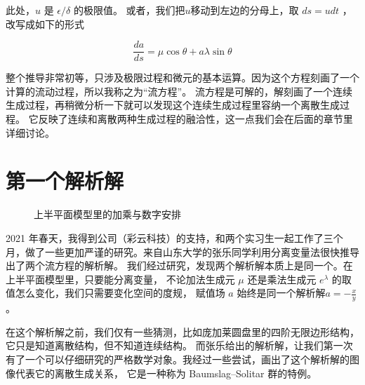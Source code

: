 \documentclass[a4paper,12pt]{book}
\numberwithin{problem}{section}
\numberwithin{definition}{section}
\numberwithin{lemma}{section}
\numberwithin{proposition}{section}
\numberwithin{theorem}{section}
\numberwithin{grammar}{section}
\numberwithin{program}{section}
\numberwithin{convention}{section}
\numberwithin{corollary}{section}
\begin{document}
此处，$u$ 是 $\epsilon / \delta$ 的极限值。 或者，我们把$u$移动到左边的分母上，取 $ds = u dt$ ，改写成如下的形式

\begin{equation}
\frac{da}{ds} = \mu \cos \theta + a \lambda \sin \theta\label{eq:flow}
\end{equation}

整个推导非常初等，只涉及极限过程和微元的基本运算。因为这个方程刻画了一个计算的流动过程，所以我称之为“流方程”。
流方程是可解的，解刻画了一个连续生成过程，再稍微分析一下就可以发现这个连续生成过程里容纳一个离散生成过程。
它反映了连续和离散两种生成过程的融洽性，这一点我们会在后面的章节里详细讨论。

\section{第一个解析解}

\begin{figure}[ht]\centering
{}
\caption{上半平面模型里的加乘与数字安排}\label{fig:assignment1}
\end{figure}

2021 年春天，我得到公司（彩云科技）的支持，和两个实习生一起工作了三个月，做了一些更加严谨的研究。来自山东大学的张乐同学利用分离变量法很快推导出了两个流方程的解析解。
我们经过研究，发现两个解析解本质上是同一个。在上半平面模型里，只要能分离变量，
不论加法生成元 $\mu$ 还是乘法生成元 $e^\lambda$ 的取值怎么变化，我们只需要变化空间的度规，
赋值场 $a$ 始终是同一个解析解$a = - \frac{x}{y}$。

在这个解析解之前，我们仅有一些猜测，比如庞加莱圆盘里的四阶无限边形结构，它只是知道离散结构，但不知道连续结构。
而张乐给出的解析解，让我们第一次有了一个可以仔细研究的严格数学对象。我经过一些尝试，画出了这个解析解的图像代表它的离散生成关系，
它是一种称为 Baumslag–Solitar 群的特例。
\end{document}

